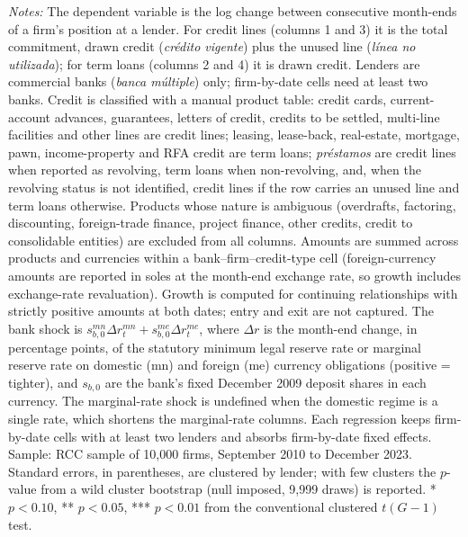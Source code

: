 \begin{table}[!h]
\begin{threeparttable}[b]
      \begin{tablenotes}\item \textit{Notes:} The dependent variable is the log change between consecutive month-ends of a firm's position at a lender. For credit lines (columns 1 and 3) it is the total commitment, drawn credit (\textit{cr\'edito vigente}) plus the unused line (\textit{l\'inea no utilizada}); for term loans (columns 2 and 4) it is drawn credit. Lenders are commercial banks (\textit{banca m\'ultiple}) only; firm-by-date cells need at least two banks. Credit is classified with a manual product table: credit cards, current-account advances, guarantees, letters of credit, credits to be settled, multi-line facilities and other lines are credit lines; leasing, lease-back, real-estate, mortgage, pawn, income-property and RFA credit are term loans; \textit{pr\'estamos} are credit lines when reported as revolving, term loans when non-revolving, and, when the revolving status is not identified, credit lines if the row carries an unused line and term loans otherwise. Products whose nature is ambiguous (overdrafts, factoring, discounting, foreign-trade finance, project finance, other credits, credit to consolidable entities) are excluded from all columns. Amounts are summed across products and currencies within a bank--firm--credit-type cell (foreign-currency amounts are reported in soles at the month-end exchange rate, so growth includes exchange-rate revaluation). Growth is computed for continuing relationships with strictly positive amounts at both dates; entry and exit are not captured. The bank shock is $s^{mn}_{b,0}\Delta r^{mn}_{t}+s^{me}_{b,0}\Delta r^{me}_{t}$, where $\Delta r$ is the month-end change, in percentage points, of the statutory minimum legal reserve rate or marginal reserve rate on domestic (mn) and foreign (me) currency obligations (positive = tighter), and $s_{b,0}$ are the bank's fixed December 2009 deposit shares in each currency. The marginal-rate shock is undefined when the domestic regime is a single rate, which shortens the marginal-rate columns. Each regression keeps firm-by-date cells with at least two lenders and absorbs firm-by-date fixed effects. Sample: RCC sample of 10,000 firms, September 2010 to December 2023. Standard errors, in parentheses, are clustered by lender; with few clusters the $p$-value from a wild cluster bootstrap (null imposed, 9,999 draws) is reported. * $p<0.10$, ** $p<0.05$, *** $p<0.01$ from the conventional clustered $t(G-1)$ test.
      \end{tablenotes}
   \end{threeparttable}
\end{table}


